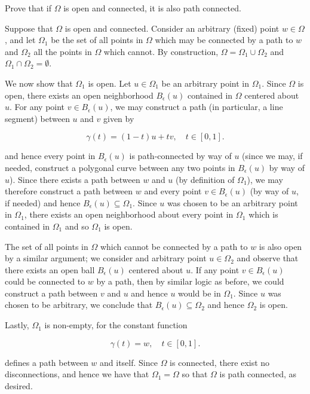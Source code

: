 Prove that if $\Omega$ is open and connected, it is also path connected.

\begin{solution}
    Suppose that $\Omega$ is open and connected. Consider an arbitrary (fixed) point $w \in \Omega$, and let $\Omega_1$
    be the set of all points in $\Omega$ which may be connected by a path to $w$ and $\Omega_2$ all the points in 
    $\Omega$ which cannot. By construction, $\Omega = \Omega_1 \cup \Omega_2$ and $\Omega_1 \cap \Omega_2 = \emptyset$.
    
    We now show that $\Omega_1$ is open. Let $u \in \Omega_1$ be an arbitrary point in 
    $\Omega_1$. Since $\Omega$ is open, there exists an open neighborhood $B_{\epsilon}(u)$ contained in $\Omega$ 
    centered about $u$. For any point $v \in B_{\epsilon}(u)$, we may construct a path (in particular, a line segment) 
    between $u$ and $v$ given by

    $$
        \gamma(t) = (1-t)u + tv, \quad t \in [0,1].
    $$  

    and hence every point in $B_{\epsilon}(u)$ is path-connected by way of $u$ (since we may, if needed, construct a 
    polygonal curve between any two points in $B_{\epsilon}(u)$ by way of $u$). Since there exists a path between $w$ 
    and $u$ (by definition of $\Omega_1$), we may therefore construct a path between $w$ and every point 
    $v \in B_{\epsilon}(u)$ (by way of $u$, if needed) and hence $B_{\epsilon}(u) \subseteq \Omega_1$. Since $u$ was 
    chosen to be an arbitrary point in $\Omega_1$, there exists an open neighborhood about every point in $\Omega_1$
    which is contained in $\Omega_1$ and so $\Omega_1$ is open.

    The set of all points in $\Omega$ which cannot be connected by a path to $w$ is also open by a similar argument; we
    consider and arbitrary point $u \in \Omega_2$ and observe that there exists an open ball $B_{\epsilon}(u)$ centered
    about $u$. If any point $v \in B_{\epsilon}(u)$ could be connected to $w$ by a path, then by similar logic as 
    before, we could construct a path between $v$ and $u$ and hence $u$ would be in $\Omega_1$. Since $u$ was chosen to
    be arbitrary, we conclude that $B_{\epsilon}(u) \subseteq \Omega_2$ and hence $\Omega_2$ is open.

    Lastly, $\Omega_1$ is non-empty, for the constant function
    
    $$
        \gamma(t) = w, \quad t \in [0,1].
    $$

    defines a path between $w$ and itself. Since $\Omega$ is connected, there exist no disconnections, and hence we have
    that $\Omega_1 = \Omega$ so that $\Omega$ is path connected, as desired.
    \ \\
\end{solution}